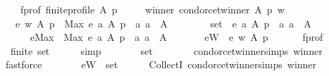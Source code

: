 \begin{isabellebody}
\ \ \ \ f{\isacharunderscore}{\kern0pt}prof{\isacharcolon}{\kern0pt}\ {\isachardoublequoteopen}finite{\isacharunderscore}{\kern0pt}profile\ A\ p{\isachardoublequoteclose}\ \isanewline
\ \ \ \ winner{\isacharcolon}{\kern0pt}\ {\isachardoublequoteopen}condorcet{\isacharunderscore}{\kern0pt}winner\ A\ p\ w{\isachardoublequoteclose}\isanewline
\ \ \ {\isachardoublequoteopen}e\ w\ A\ p\ {\isacharequal}{\kern0pt}\ Max\ {\isacharbraceleft}{\kern0pt}e\ a\ A\ p\ {\isacharbar}{\kern0pt}\ a{\isachardot}{\kern0pt}\ a\ {\isasymin}\ A{\isacharbraceright}{\kern0pt}{\isachardoublequoteclose}\isanewline
%
\isadelimproof
%
\endisadelimproof
%
\isatagproof
{}\isamarkupfalse%
\ {\isacharminus}{\kern0pt}\isanewline
\ \ \isanewline
\ \ \isamarkupfalse%
\ {\isacharquery}{\kern0pt}set\ {\isacharequal}{\kern0pt}\ {\isachardoublequoteopen}{\isacharbraceleft}{\kern0pt}e\ a\ A\ p\ {\isacharbar}{\kern0pt}\ a{\isachardot}{\kern0pt}\ a\ {\isasymin}\ A{\isacharbraceright}{\kern0pt}{\isachardoublequoteclose}\ \isanewline
\ \ \ \ \ \ {\isacharquery}{\kern0pt}eMax\ {\isacharequal}{\kern0pt}\ {\isachardoublequoteopen}Max\ {\isacharbraceleft}{\kern0pt}e\ a\ A\ p\ {\isacharbar}{\kern0pt}\ a{\isachardot}{\kern0pt}\ a\ {\isasymin}\ A{\isacharbraceright}{\kern0pt}{\isachardoublequoteclose}\ \isanewline
\ \ \ \ \ \ {\isacharquery}{\kern0pt}eW\ {\isacharequal}{\kern0pt}\ {\isachardoublequoteopen}e\ w\ A\ p{\isachardoublequoteclose}\isanewline
\ \ \isanewline
\ \ \isamarkupfalse%
\ f{\isacharunderscore}{\kern0pt}prof\ \isamarkupfalse%
\ {}{\isacharcolon}{\kern0pt}\ {\isachardoublequoteopen}finite\ {\isacharquery}{\kern0pt}set{\isachardoublequoteclose}\isanewline
\ \ \ \ \isamarkupfalse%
\ simp\isanewline
\ \ \isanewline
\ \ \isamarkupfalse%
\ {}{\isacharcolon}{\kern0pt}\ {\isachardoublequoteopen}{\isacharquery}{\kern0pt}set\ {\isasymnoteq}\ {\isacharbraceleft}{\kern0pt}{\isacharbraceright}{\kern0pt}{\isachardoublequoteclose}\isanewline
\ \ \ \ \isamarkupfalse%
\ condorcet{\isacharunderscore}{\kern0pt}winner{\isachardot}{\kern0pt}simps\ winner\isanewline
\ \ \ \ \isamarkupfalse%
\ fastforce\isanewline
\ \ \isanewline
\ \ \isamarkupfalse%
\ {}{\isacharcolon}{\kern0pt}\ {\isachardoublequoteopen}{\isacharquery}{\kern0pt}eW\ {\isasymin}\ {\isacharquery}{\kern0pt}set{\isachardoublequoteclose}\isanewline
\ \ \ \ \isamarkupfalse%
\ CollectI\ condorcet{\isacharunderscore}{\kern0pt}winner{\isachardot}{\kern0pt}simps\ winner\isanewline

\end{isabellebody}
